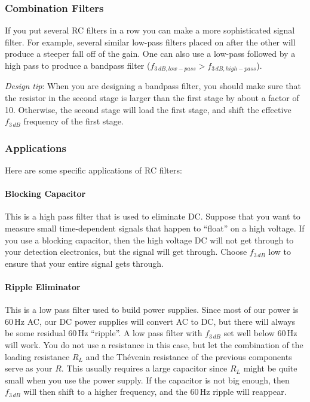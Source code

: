 \documentclass{article}
\begin{document}
\subsubsection{Combination Filters}
If you put several RC filters in a row you can make a more sophisticated signal filter. For example, several similar low-pass filters placed on after the other will produce a steeper fall off of the gain. One can also use a low-pass followed by a high pass to produce a bandpass filter ($f_{3\,dB,low-pass} > f_{3\,dB,high-pass}$).

\emph{Design tip}: When you are designing a bandpass filter, you should make sure that the resistor in the second stage is larger than the first stage by about a factor of 10. Otherwise, the second stage will load the first stage, and shift the effective $f_{3\,dB}$ frequency of the first stage.

\subsubsection{Applications}
Here are some specific applications of RC filters:

\paragraph{Blocking Capacitor}
This is a high pass filter that is used to eliminate DC. Suppose that you want to measure small time-dependent signals that happen to ``float'' on a high voltage. If you use a blocking capacitor, then the high voltage DC will not get through to your detection electronics, but the signal will get through. Choose $f_{3\,dB}$ low to ensure that your entire signal gets through.
 
\paragraph{Ripple Eliminator}
This is a low pass filter used to build power supplies. Since most of our power is 60\,Hz AC, our DC power supplies will convert AC to DC, but there will always be some residual 60\,Hz ``ripple''. A low pass filter with $f_{3\,dB}$ set well below 60\,Hz will work. You do not use a resistance in this case, but let the combination of the loading resistance $R_L$ and the Th\'{e}venin resistance of the previous components serve as your $R$. This usually requires a large capacitor since $R_L$ might be quite small when you use the power supply. If the capacitor is not big enough, then $f_{3\,dB}$ will then shift to a higher frequency, and the 60\,Hz ripple will reappear.
\end{document}
